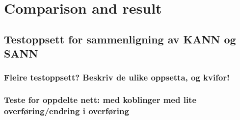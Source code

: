 
\chapter{Comparison and result} %


\section{Testoppsett for sammenligning av KANN og SANN}
	\subsection{Fleire testoppsett? Beskriv de ulike oppsetta, og kvifor!}
	\subsection{Teste for oppdelte nett: med koblinger med lite overføring/endring i overføring}
